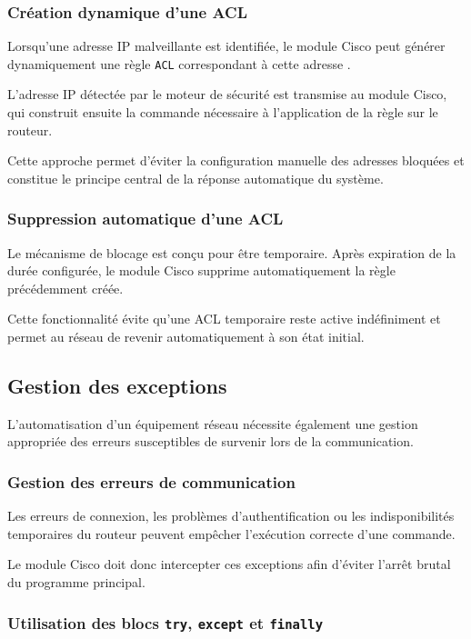 \subsubsection{Création dynamique d'une ACL}

Lorsqu'une adresse IP malveillante est identifiée, le module Cisco peut générer dynamiquement une règle \texttt{ACL} correspondant à cette adresse \cite{cisco_ios}.

L'adresse IP détectée par le moteur de sécurité est transmise au module Cisco, qui construit ensuite la commande nécessaire à l'application de la règle sur le routeur.

Cette approche permet d'éviter la configuration manuelle des adresses bloquées et constitue le principe central de la réponse automatique du système.

\subsubsection{Suppression automatique d'une ACL}

Le mécanisme de blocage est conçu pour être temporaire. Après expiration de la durée configurée, le module Cisco supprime automatiquement la règle précédemment créée.

Cette fonctionnalité évite qu'une ACL temporaire reste active indéfiniment et permet au réseau de revenir automatiquement à son état initial.

\subsection{Gestion des exceptions}

L'automatisation d'un équipement réseau nécessite également une gestion appropriée des erreurs susceptibles de survenir lors de la communication.

\subsubsection{Gestion des erreurs de communication}

Les erreurs de connexion, les problèmes d'authentification ou les indisponibilités temporaires du routeur peuvent empêcher l'exécution correcte d'une commande.

Le module Cisco doit donc intercepter ces exceptions afin d'éviter l'arrêt brutal du programme principal.

\subsubsection{Utilisation des blocs \texttt{try}, \texttt{except} et \texttt{finally}}

